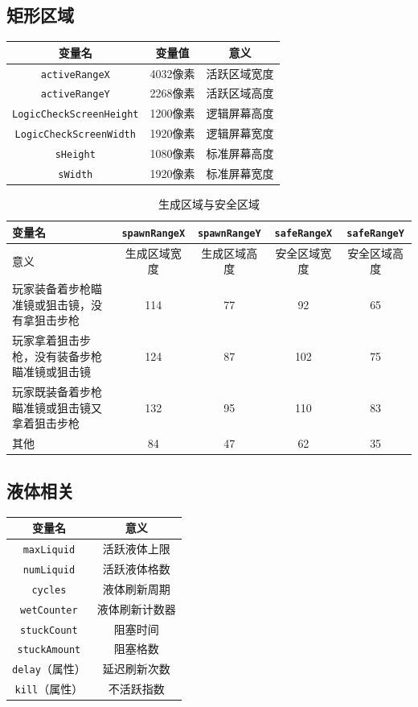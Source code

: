 \subsection{矩形区域}\label{tab9}
\begin{longtable}{|c|c|c|}
\hline 变量名&变量值&意义\\\hline
\endhead
\hline
\endfoot
{\lstinline!activeRangeX!}&4032像素&活跃区域宽度\\\hline
{\lstinline!activeRangeY!}&2268像素&活跃区域高度\\\hline
{\lstinline!LogicCheckScreenHeight!}&1200像素&逻辑屏幕高度\\\hline
{\lstinline!LogicCheckScreenWidth!}&1920像素&逻辑屏幕宽度\\\hline
{\lstinline!sHeight!}&1080像素&标准屏幕高度\\\hline
{\lstinline!sWidth!}&1920像素&标准屏幕宽度\\
\end{longtable}

\begin{table}[!h]
    \centering
    \begin{tabular}{|p{}<{\centering}|c|c|c|c|}
         \hline 变量名&{\lstinline!spawnRangeX!}&{\lstinline!spawnRangeY!}&{\lstinline!safeRangeX!}&{\lstinline!safeRangeY!}  \\\hline
         意义&生成区域宽度&生成区域高度&安全区域宽度&安全区域高度\\\hline
         玩家装备着步枪瞄准镜或狙击镜，没有拿狙击步枪&114&77&92&65\\\hline
         玩家拿着狙击步枪，没有装备步枪瞄准镜或狙击镜&124&87&102&75\\\hline
         玩家既装备着步枪瞄准镜或狙击镜又拿着狙击步枪&132&95&110&83\\\hline
         其他&84&47&62&35\\\hline
    \end{tabular}
    \caption{生成区域与安全区域}
    \label{tab4618}
\end{table}

\subsection{液体相关}\label{tab10}
\begin{longtable}{|c|c|}
\hline 变量名&意义\\\hline
\endhead
{\lstinline!maxLiquid!}&活跃液体上限\\\hline
{\lstinline!numLiquid!}&活跃液体格数\\\hline
{\lstinline!cycles!}&液体刷新周期\\\hline
{\lstinline!wetCounter!}&液体刷新计数器\\\hline
{\lstinline!stuckCount!}&阻塞时间\\\hline
{\lstinline!stuckAmount!}&阻塞格数\\\hline
{\lstinline!delay!}（属性）&延迟刷新次数\\\hline
{\lstinline!kill!}（属性）&不活跃指数\\\hline
\end{longtable}

